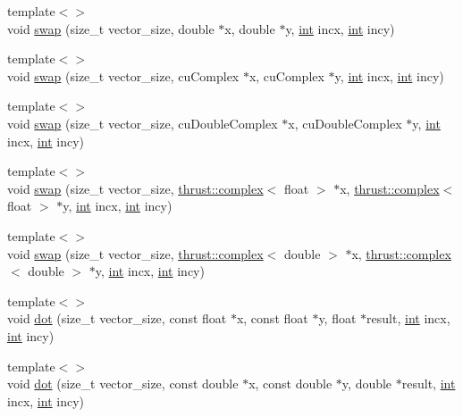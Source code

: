 \begin{DoxyCompactItemize}
\item 
{\footnotesize template$<$$>$ }\\void \hyperlink{classcublas__wrap_a615f7a98b7028b2ac88503f6001ecf9c}{swap} (size\-\_\-t vector\-\_\-size, double $\ast$x, double $\ast$y, \hyperlink{classint}{int} incx, \hyperlink{classint}{int} incy)
\item 
{\footnotesize template$<$$>$ }\\void \hyperlink{classcublas__wrap_a1a0be9e7d1bd191fba7d4d5068505831}{swap} (size\-\_\-t vector\-\_\-size, cu\-Complex $\ast$x, cu\-Complex $\ast$y, \hyperlink{classint}{int} incx, \hyperlink{classint}{int} incy)
\item 
{\footnotesize template$<$$>$ }\\void \hyperlink{classcublas__wrap_a48b7bb28308d3fe7294d1c49b8ecfac3}{swap} (size\-\_\-t vector\-\_\-size, cu\-Double\-Complex $\ast$x, cu\-Double\-Complex $\ast$y, \hyperlink{classint}{int} incx, \hyperlink{classint}{int} incy)
\item 
{\footnotesize template$<$$>$ }\\void \hyperlink{classcublas__wrap_a5ad1a368d93836e3fc06b3cdf2500f47}{swap} (size\-\_\-t vector\-\_\-size, \hyperlink{test__deflation__typedefs_8h_a25cabcac5deb559feab415e2c445d8ba}{thrust\-::complex}$<$ float $>$ $\ast$x, \hyperlink{test__deflation__typedefs_8h_a25cabcac5deb559feab415e2c445d8ba}{thrust\-::complex}$<$ float $>$ $\ast$y, \hyperlink{classint}{int} incx, \hyperlink{classint}{int} incy)
\item 
{\footnotesize template$<$$>$ }\\void \hyperlink{classcublas__wrap_a871eeeaa1f9d873f03623c30a7d97e15}{swap} (size\-\_\-t vector\-\_\-size, \hyperlink{test__deflation__typedefs_8h_a25cabcac5deb559feab415e2c445d8ba}{thrust\-::complex}$<$ double $>$ $\ast$x, \hyperlink{test__deflation__typedefs_8h_a25cabcac5deb559feab415e2c445d8ba}{thrust\-::complex}$<$ double $>$ $\ast$y, \hyperlink{classint}{int} incx, \hyperlink{classint}{int} incy)
\item 
{\footnotesize template$<$$>$ }\\void \hyperlink{classcublas__wrap_a00a66d39c3999d447a8bc6751683f3f0}{dot} (size\-\_\-t vector\-\_\-size, const float $\ast$x, const float $\ast$y, float $\ast$result, \hyperlink{classint}{int} incx, \hyperlink{classint}{int} incy)
\item 
{\footnotesize template$<$$>$ }\\void \hyperlink{classcublas__wrap_a5ea291ff8bfb9c186f5aa7e3c5231b80}{dot} (size\-\_\-t vector\-\_\-size, const double $\ast$x, const double $\ast$y, double $\ast$result, \hyperlink{classint}{int} incx, \hyperlink{classint}{int} incy)

\end{DoxyCompactItemize}
